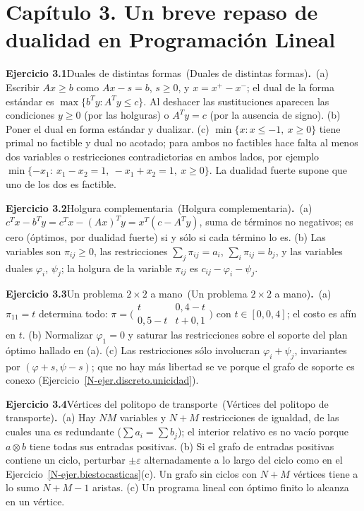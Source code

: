\documentclass[11pt,a4paper]{amsart}
\newcommand{\ve}{\varepsilon}
\theoremstyle{remark}
\theoremstyle{definition}
\numberwithin{subsection}{section}
\numberwithin{equation}{section}
\newcommand{\ejlabel}[2]{\par\medskip\noindent\textbf{Ejercicio #1}\ifx\relax#2\relax\else\ (#2)\fi\textbf{.}\ }
\begin{document}
\section*{Capítulo 3. Un breve repaso de dualidad en Programación Lineal}
\ejlabel{3.1}{Duales de distintas formas}(a) Escribir $Ax\ge b$ como $Ax-s=b$, $s\ge0$, y $x=x^+-x^-$; el dual de la forma estándar es $\max\{b^Ty:A^Ty\le c\}$. Al deshacer las sustituciones aparecen las condiciones $y\ge0$ (por las holguras) o $A^Ty=c$ (por la ausencia de signo). (b) Poner el dual en forma estándar y dualizar. (c) $\min\{x:x\le-1,\ x\ge0\}$ tiene primal no factible y dual no acotado; para ambos no factibles hace falta al menos dos variables o restricciones contradictorias en ambos lados, por ejemplo $\min\{-x_1:\ x_1-x_2=1,\ -x_1+x_2=1,\ x\ge0\}$. La dualidad fuerte supone que uno de los dos es factible.

\ejlabel{3.2}{Holgura complementaria}(a) $c^Tx-b^Ty=c^Tx-(Ax)^Ty=x^T(c-A^Ty)$, suma de términos no negativos; es cero (óptimos, por dualidad fuerte) si y sólo si cada término lo es. (b) Las variables son $\pi_{ij}\ge0$, las restricciones $\sum_j\pi_{ij}=a_i$, $\sum_i\pi_{ij}=b_j$, y las variables duales $\varphi_i$, $\psi_j$; la holgura de la variable $\pi_{ij}$ es $c_{ij}-\varphi_i-\psi_j$.

\ejlabel{3.3}{Un problema $2\times2$ a mano}(a) $\pi_{11}=t$ determina todo: $\pi=\bigl(\begin{smallmatrix}t&0{,}4-t\\0{,}5-t&t+0{,}1\end{smallmatrix}\bigr)$ con $t\in[0,0{,}4]$; el costo es afín en $t$. (b) Normalizar $\varphi_1=0$ y saturar las restricciones sobre el soporte del plan óptimo hallado en (a). (c) Las restricciones sólo involucran $\varphi_i+\psi_j$, invariantes por $(\varphi+s,\psi-s)$; que no hay más libertad se ve porque el grafo de soporte es conexo (Ejercicio~\ref{N-ejer.discreto.unicidad}).

\ejlabel{3.4}{Vértices del politopo de transporte}(a) Hay $NM$ variables y $N+M$ restricciones de igualdad, de las cuales una es redundante ($\sum a_i=\sum b_j$); el interior relativo es no vacío porque $a\otimes b$ tiene todas sus entradas positivas. (b) Si el grafo de entradas positivas contiene un ciclo, perturbar $\pm\ve$ alternadamente a lo largo del ciclo como en el Ejercicio~\ref{N-ejer.biestocasticas}(c). Un grafo sin ciclos con $N+M$ vértices tiene a lo sumo $N+M-1$ aristas. (c) Un programa lineal con óptimo finito lo alcanza en un vértice.
\end{document}
